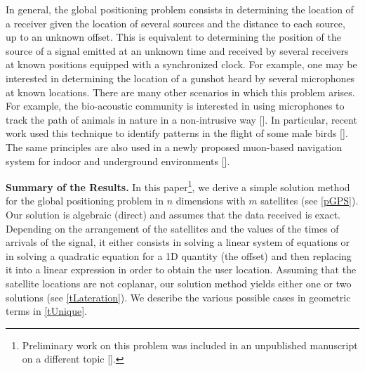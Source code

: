 \documentclass[reqno]{amsart}
\begin{document}
In general, the global positioning problem consists in determining the location of a receiver given the location of several sources and the distance to each source, up to an unknown offset. This is equivalent to determining the position of the source of a signal emitted at an unknown time and received by several receivers at known positions equipped with a synchronized clock. For example, one may be interested in determining the location of a gunshot heard by several microphones at known locations. There are many other scenarios in which this problem arises. For example, the bio-acoustic community is interested in using microphones to track the path of animals in nature in a non-intrusive way []. In particular, recent work used this technique to identify patterns in the flight of some male birds []. The same principles are also used in a newly proposed muon-based navigation system for indoor and underground environments [].



\par{\bf Summary of the Results.}
In this paper\footnote{Preliminary work on this problem was included in an unpublished manuscript on a different topic [].}, we derive a simple solution method for the global positioning problem in $n$ dimensions with $m$ satellites (see \cref{pGPS}). Our solution is algebraic (direct) and assumes that the data received is exact. Depending on the arrangement of the satellites and the values of the times of arrivals of the signal, it either consists in solving a linear system of equations or in solving a quadratic equation for a 1D quantity (the offset) and then replacing it into a linear expression in order to obtain the user location. Assuming that the satellite locations are not coplanar, our solution method yields either one or two solutions (see \cref{tLateration}).
We describe the various possible cases in geometric terms in \cref{tUnique}.
\end{document}
